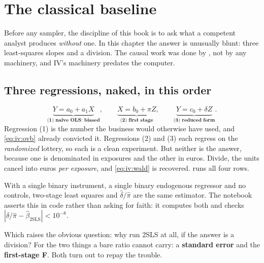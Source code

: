 \section{The classical baseline}
\label{sec:iv:classical}

Before any sampler, the discipline of this book is to ask what a competent analyst produces
\emph{without} one. In this chapter the answer is unusually blunt: three least-squares slopes and a
division. The causal work was done by , not by any machinery, and
IV's machinery predates the computer.

\subsection*{Three regressions, naked, in this order}

\begin{equation}
  \underbrace{Y = a_0 + a_1 X}_{\textbf{(1) naive OLS: biased}}, \qquad
  \underbrace{X = b_0 + \pi Z}_{\textbf{(2) first stage}}, \qquad
  \underbrace{Y = c_0 + \delta Z}_{\textbf{(3) reduced form}} .
  \label{eq:iv:three}
\end{equation}
%
Regression (1) is the number the business would otherwise have used, and \cref{eq:iv:ovb} already
convicted it. Regressions (2) and (3) each regress on the \emph{randomized} lottery, so each is a
clean experiment. But neither is the answer, because one is denominated in exposures and the
other in euros. Divide, the units cancel into euros \emph{per exposure}, and
\cref{eq:iv:wald} is recovered.  runs all four rows.



\begin{proposition}\label{prop:iv:wald}
With a single binary instrument, a single binary endogenous regressor and no controls, two-stage
least squares and $\hat\delta/\hat\pi$ are the same estimator. The notebook asserts this in code
rather than asking for faith: it computes both and checks
$|\hat\delta/\hat\pi - \hat\beta_{\text{2SLS}}| < 10^{-8}$.
\end{proposition}

Which raises the obvious question: why run 2SLS at all, if the answer is a division? For the two
things a bare ratio cannot carry: a \textbf{standard error} and the \textbf{first-stage F}. Both
turn out to repay the trouble.

